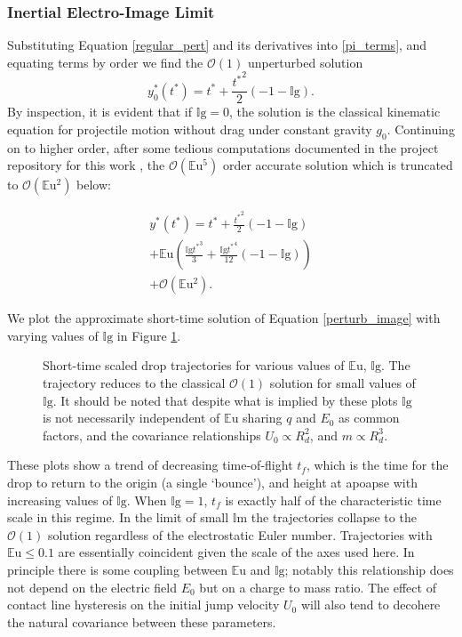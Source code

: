 \documentclass[aip,reprint, floatfix]{revtex4-1}
\begin{document}
\subsubsection{Inertial Electro-Image Limit}
Substituting Equation \ref{regular_pert} and its derivatives into \ref{pi_terms}, and equating terms by order we find the $\mathcal{O}(1)$ unperturbed solution
\[{y^*_{0}}{\left ({t^*} \right )} = {t^*} + \frac{{t^*}^{2}}{2} \left(-1 - \mathbb{I}\mbox{g}\right). \]
By inspection, it is evident that if $\mathbb{I}\mbox{g}=0$, the solution is the classical kinematic equation for projectile motion without drag under constant gravity $g_0$. Continuing on to higher order, after some tedious computations documented in the project repository for this work \cite{schmidt_droplet_electro-bounce:_2017}, the $\mathcal{O}(\mathbb{E}\mbox{u}^5)$ order accurate solution which is truncated to $\mathcal{O}(\mathbb{E}\mbox{u}^2)$ below:

\begin{gather}
{y^*}({t^*}) = {t^*} + \frac{{t^*}^{2}}{2} \left(-1 - \mathbb{I}\mbox{g}\right) \nonumber \\
 + \mathbb{E}\mbox{u} \left(\frac{\mathbb{I}\mbox{g} {t^*}^{3}}{3} + \frac{\mathbb{I}\mbox{g} {t^*}^{4}}{12} \left(-1 - \mathbb{I}\mbox{g} \right)\right) \nonumber \\
 + \mathcal{O}(\mathbb{E}\mbox{u}^2). \label{perturb_image}
\end{gather}

We plot the approximate short-time solution of Equation \ref{perturb_image} with varying values of $\mathbb{I}\mbox{g}$ in Figure \ref{fig:short_times}.

\begin{figure}[htp]
    \resizebox{0.8\textwidth}{!}{}
    \caption{Short-time scaled drop trajectories for various values of $\mathbb{E}\mbox{u}$, $\mathbb{I}\mbox{g}$. The trajectory reduces to the classical $\mathcal{O}(1)$ solution for small values of $\mathbb{I}\mbox{g}$. It should be noted that despite what is implied by these plots $\mathbb{I}\mbox{g}$ is not necessarily independent of $\mathbb{E}\mbox{u}$ sharing $q$ and $E_0$ as common factors, and the covariance relationships $U_0 \propto R_d^2$, and $m \propto R_d^3$.}
    \label{fig:short_times}
\end{figure}
These plots show a trend of decreasing time-of-flight $t_f$, which is the time for the drop to return to the origin (a single `bounce'), and height at apoapse with increasing values of $\mathbb{I}\mbox{g}$. When $\mathbb{I}\mbox{g} = 1$, $t_f$ is exactly half of the characteristic time scale in this regime. In the limit of small $\mathbb{I}\mbox{m}$ the trajectories collapse to the $\mathcal{O}(1)$ solution regardless of the electrostatic Euler number. Trajectories with $\mathbb{E}\mbox{u} \leq 0.1$ are essentially coincident given the scale of the axes used here. In principle there is some coupling between $\mathbb{E}\mbox{u}$ and $\mathbb{I}\mbox{g}$; notably this relationship does not depend on the electric field $E_0$ but on a charge to mass ratio. The effect of contact line hysteresis on the initial jump velocity $U_0$ will also tend to decohere the natural covariance between these parameters.
\end{document}
